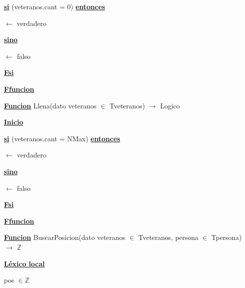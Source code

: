 \documentclass{article}
\begin{document}
            \hspace{12mm}\underline{\textbf{si}} (veteranos.cant = 0) \underline{\textbf{entonces}}

                \hspace{16mm}$\leftarrow$ verdadero

            \hspace{12mm}\underline{\textbf{sino}}

                \hspace{16mm}$\leftarrow$ falso

        \hspace{12mm}\underline{\textbf{Fsi}}

    \hspace{4mm}\underline{\textbf{Ffuncion}}

    \vspace{4mm}

    \hspace{4mm}\underline{\textbf{Funcion}} Llena(dato veteranos $\in$ Tveteranos) $\rightarrow$ Logico

        \hspace{8mm}\underline{\textbf{Inicio}}

            \hspace{12mm}\underline{\textbf{si}} (veteranos.cant = NMax) \underline{\textbf{entonces}}

                \hspace{16mm}$\leftarrow$ verdadero

            \hspace{12mm}\underline{\textbf{sino}}

                \hspace{16mm}$\leftarrow$ falso

            \hspace{12mm}\underline{\textbf{Fsi}}

    \hspace{4mm}\underline{\textbf{Ffuncion}}

    \vspace{4mm}

    \hspace{4mm}\underline{\textbf{Funcion}} BuscarPosicion(dato veteranos $\in$ Tveteranos, persona $\in$ Tpersona) $\rightarrow$ $\mathbb{Z}$

        \hspace{8mm}\underline{\textbf{Léxico local}}

            \hspace{12mm}pos $\in \mathbb{Z}$
            
\end{document}

